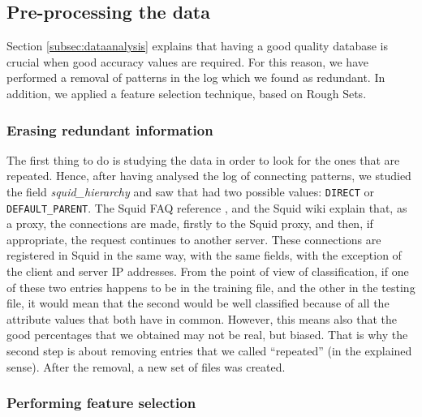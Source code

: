 \documentclass{llncs}
\begin{document}
%
\subsection{Pre-processing the data}
\label{subsec:preprocessing}

Section \ref{subsec:dataanalysis} explains that having a good quality database is crucial when good accuracy values are required. For this reason, we have performed a removal of patterns in the log which we found as redundant. In addition, we applied a feature selection technique, based on Rough Sets.

%
\subsubsection{Erasing redundant information}
\label{subsec:duplicateddata}

The first thing to do is studying the data in order to look for the ones that are repeated. Hence, after having analysed the log of connecting patterns, we studied the field \textit{squid\_hierarchy} and saw that had two possible values: \texttt{DIRECT} or \texttt{DEFAULT\_PARENT}. The Squid FAQ reference \cite{squid_logs}, and the Squid wiki \cite{squid_wiki} explain that, as a proxy, the connections are made, firstly to the Squid proxy, and then, if appropriate, the request continues to another server. These connections are registered in Squid in the same way, with the same fields, with the exception of the client and server IP addresses. From the point of view of classification, if one of these two entries happens to be in the training file, and the other in the testing file, it would mean that the second would be well classified because of all the attribute values that both have in common. However, this means also that the good percentages that we obtained may not be real, but biased. That is why the second step is about removing entries that we called ``repeated'' (in the explained sense). After the removal, a new set of files was created.

%
\subsubsection{Performing feature selection}
\label{subsec:featselresults}
\end{document}
